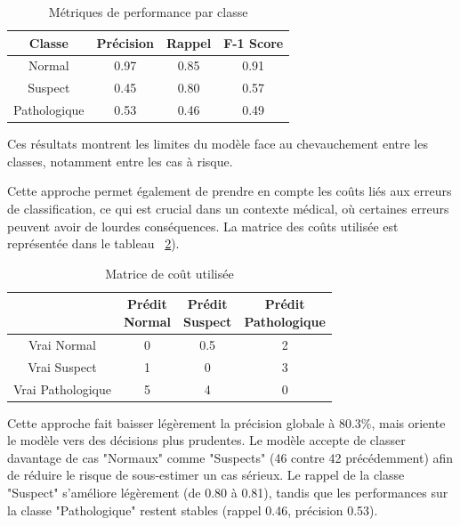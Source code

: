 \documentclass[twocolumn,10pt]{article}
\begin{document}
\begin{table}[htbp]
\begin{center}
\caption{\label{tab:perf}Métriques de performance par classe}
\begin{tabular}{cccc}
\toprule
Classe & Précision & Rappel & F-1 Score \\
\midrule
Normal & 0.97 & 0.85 & 0.91 \\
Suspect & 0.45 & 0.80 & 0.57 \\
Pathologique & 0.53 & 0.46 & 0.49 \\
\bottomrule
\end{tabular}
\end{center}
\end{table}

Ces résultats montrent les limites du modèle face au chevauchement entre les classes, notamment entre les cas à risque.

Cette approche permet également de prendre en compte les coûts liés aux erreurs de classification, ce qui est crucial dans un contexte médical, où certaines erreurs peuvent avoir de lourdes conséquences. La matrice des coûts utilisée est représentée dans le tableau ~\ref{tab:mat_couts}).

\begin{table}[htbp]
\centering
\caption{\label{tab:mat_couts}Matrice de coût utilisée}
\begin{tabular}{cccc}
\toprule
 & \makecell{Prédit\\Normal} 
 & \makecell{Prédit\\Suspect} 
 & \makecell{Prédit\\Pathologique} \\
\midrule
Vrai Normal & 0 & 0.5 & 2 \\
Vrai Suspect & 1 & 0 & 3 \\
Vrai Pathologique & 5 & 4 & 0 \\
\bottomrule
\end{tabular}
\end{table}


Cette approche fait baisser légèrement la précision globale à 80.3\%, mais oriente le modèle vers des décisions plus prudentes. Le modèle accepte de classer davantage de cas "Normaux" comme "Suspects" (46 contre 42 précédemment) afin de réduire le risque de sous-estimer un cas sérieux. Le rappel de la classe "Suspect" s'améliore légèrement (de 0.80 à 0.81), tandis que les performances sur la classe "Pathologique" restent stables (rappel 0.46, précision 0.53).
\end{document}

